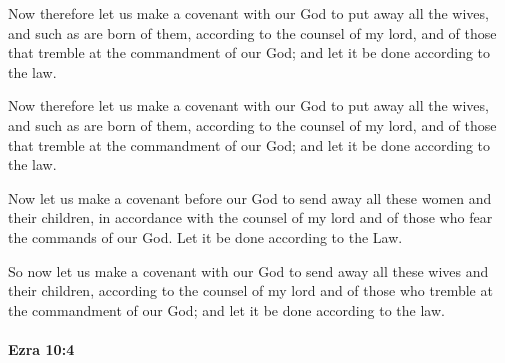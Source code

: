 			Now therefore let us make a covenant with our God to put away all the wives, and such as are born of them, according to the counsel of my lord, and of those that tremble at the commandment of our God; and let it be done according to the law.

			\begin{versebox}
					\item[BHS] 
					\item[LXX] 
					\item[ASV] Now therefore let us make a covenant with our God to put away all the wives, and such as are born of them, according to the counsel of my lord, and of those that tremble at the commandment of our God; and let it be done according to the law.
					\item[NIV] Now let us make a covenant before our God to send away all these women and their children, in accordance with the counsel of my lord and of those who fear the commands of our God. Let it be done according to the Law.
					\item[NRSV] So now let us make a covenant with our God to send away all these wives and their children, according to the counsel of my lord and of those who tremble at the commandment of our God; and let it be done according to the law.
			\end{versebox}

		\paragraph{Ezra 10:4} %
			\label{EZRA-10-4}

